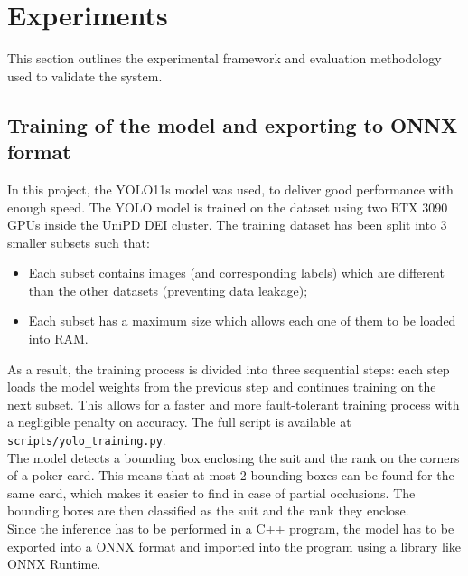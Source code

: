 \section{Experiments}
This section outlines the experimental framework and evaluation methodology used to validate the system.
\subsection{Training of the model and exporting to ONNX format}
In this project, the YOLO11s model was used, to deliver good performance with enough speed.
The YOLO model is trained on the dataset using two RTX 3090 GPUs inside the UniPD DEI cluster.
The training dataset has been split into 3 smaller subsets such that:
\begin{itemize}
    \item Each subset contains images (and corresponding labels) which are different than the other datasets (preventing data leakage);
    \item Each subset has a maximum size which allows each one of them to be loaded into RAM.
\end{itemize}
As a result, the training process is divided into three sequential steps: each step loads the model weights from the 
previous step and continues training on the next subset. This allows for a faster and more fault-tolerant training process 
with a negligible penalty on accuracy. The full script is available at \texttt{scripts/yolo\_training.py}. \\ \newline
The model detects a bounding box enclosing the suit and the rank on the corners of a poker card. This means that at most 2 bounding 
boxes can be found for the same card, which makes it easier to find in case of partial occlusions. The bounding boxes are then 
classified as the suit and the rank they enclose. \\ \newline
Since the inference has to be performed in a C++ program, the model has to be exported into a ONNX format and imported 
into the program using a library like ONNX Runtime.
